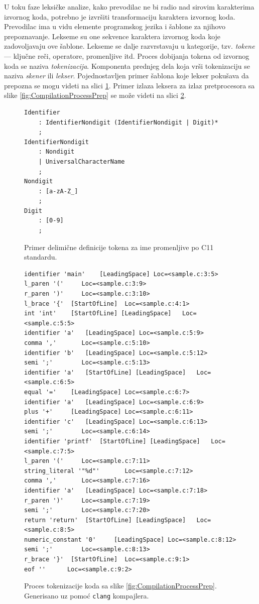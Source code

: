 U toku faze leksičke analize, kako prevodilac ne bi radio nad sirovim karakterima izvornog koda, potrebno je izvršiti transformaciju karaktera izvornog koda. Prevodilac ima u vidu elemente programskog jezika i šablone za njihovo prepoznavanje. Lekseme su one sekvence karaktera izvornog koda koje zadovoljavaju ove šablone. Lekseme se dalje razvrstavaju u kategorije, tzv. \emph{tokene} --- ključne reči, operatore, promenljive itd. Proces dobijanja tokena od izvornog koda se naziva \emph{tokenizacija}. Komponenta prednjeg dela koja vrši tokenizaciju se naziva \emph{skener} ili \emph{lekser}. Pojednostavljen primer šablona koje lekser pokušava da prepozna se mogu videti na slici \ref{fig:CLexerExample}. Primer izlaza leksera za izlaz pretprocesora sa slike \ref{fig:CompilationProcessPrep} se može videti na slici \ref{fig:CompilationProcessLex}.

\begin{figure}[h!]
\begin{lstlisting}[language={}]
Identifier 
    : IdentifierNondigit (IdentifierNondigit | Digit)*
    ;
IdentifierNondigit  
    : Nondigit
    | UniversalCharacterName
    ;
Nondigit 
    : [a-zA-Z_]
    ;
Digit 
    : [0-9]
    ;
\end{lstlisting}
\caption{Primer delimične definicije tokena za ime promenljive po C11 standardu.}
\label{fig:CLexerExample}
\end{figure}

\begin{figure}[h!]
\begin{lstlisting}[language={}]
identifier 'main'	 [LeadingSpace]	Loc=<sample.c:3:5>
l_paren '('		Loc=<sample.c:3:9>
r_paren ')'		Loc=<sample.c:3:10>
l_brace '{'	 [StartOfLine]	Loc=<sample.c:4:1>
int 'int'	 [StartOfLine] [LeadingSpace]	Loc=<sample.c:5:5>
identifier 'a'	 [LeadingSpace]	Loc=<sample.c:5:9>
comma ','		Loc=<sample.c:5:10>
identifier 'b'	 [LeadingSpace]	Loc=<sample.c:5:12>
semi ';'		Loc=<sample.c:5:13>
identifier 'a'	 [StartOfLine] [LeadingSpace]	Loc=<sample.c:6:5>
equal '='	 [LeadingSpace]	Loc=<sample.c:6:7>
identifier 'a'	 [LeadingSpace]	Loc=<sample.c:6:9>
plus '+'	 [LeadingSpace]	Loc=<sample.c:6:11>
identifier 'c'	 [LeadingSpace]	Loc=<sample.c:6:13>
semi ';'		Loc=<sample.c:6:14>
identifier 'printf'	 [StartOfLine] [LeadingSpace]	Loc=<sample.c:7:5>
l_paren '('		Loc=<sample.c:7:11>
string_literal '"%d"'		Loc=<sample.c:7:12>
comma ','		Loc=<sample.c:7:16>
identifier 'a'	 [LeadingSpace]	Loc=<sample.c:7:18>
r_paren ')'		Loc=<sample.c:7:19>
semi ';'		Loc=<sample.c:7:20>
return 'return'	 [StartOfLine] [LeadingSpace]	Loc=<sample.c:8:5>
numeric_constant '0'	 [LeadingSpace]	Loc=<sample.c:8:12>
semi ';'		Loc=<sample.c:8:13>
r_brace '}'	 [StartOfLine]	Loc=<sample.c:9:1>
eof ''		Loc=<sample.c:9:2>
\end{lstlisting}
\caption{Proces tokenizacije koda sa slike \ref{fig:CompilationProcessPrep}. Generisano uz pomoć \texttt{clang} \cite{Clang} kompajlera.}
\label{fig:CompilationProcessLex}
\end{figure}


